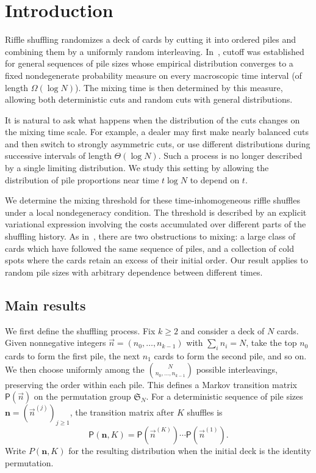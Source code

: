 \section{Introduction}

Riffle shuffling randomizes a deck of cards by cutting it into ordered
piles and combining them by a uniformly random interleaving. In~\cite{SSW},
cutoff was established for general sequences of pile sizes whose empirical
distribution converges to a fixed nondegenerate probability measure on
every macroscopic time interval (of length $\Omega(\log N)$). The mixing
time is then determined by this measure, allowing both deterministic cuts
and random cuts with general distributions.

It is natural to ask what happens when the distribution of the cuts
changes on the mixing time scale. For example, a dealer may first make
nearly balanced cuts and then switch to strongly asymmetric cuts, or use
different distributions during successive intervals of length
$\Theta(\log N)$. Such a process is no longer described by a single
limiting distribution. We study this setting by allowing the distribution
of pile proportions near time $t\log N$ to depend on $t$.

We determine the mixing threshold for these time-inhomogeneous riffle
shuffles under a local nondegeneracy condition. The threshold is described
by an explicit variational expression involving the costs accumulated
over different parts of the shuffling history. As in~\cite{SSW}, there
are two obstructions to mixing: a large class of cards which have followed
the same sequence of piles, and a collection of cold spots where the
cards retain an excess of their initial order. Our result applies to
random pile sizes with arbitrary dependence between different times.

\subsection{Main results}

We first define the shuffling process. Fix $k\ge2$ and consider a deck
of $N$ cards. Given nonnegative integers $\vec n=(n_0,\ldots,n_{k-1})$
with $\sum_i n_i=N$, take the top $n_0$ cards to form the first pile,
the next $n_1$ cards to form the second pile, and so on. We then choose
uniformly among the $\binom{N}{n_0,\ldots,n_{k-1}}$ possible interleavings,
preserving the order within each pile. This defines a Markov transition
matrix $\mathsf P(\vec n)$ on the permutation group $\mathfrak S_N$.
For a deterministic sequence of pile sizes
$\mathbf n=(\vec n^{(j)})_{j\ge1}$, the transition matrix after $K$
shuffles is
\[
 \mathsf P(\mathbf n,K)
 =\mathsf P(\vec n^{(K)})\cdots\mathsf P(\vec n^{(1)}).
\]
Write $P(\mathbf n,K)$ for the resulting distribution when the initial
deck is the identity permutation.

